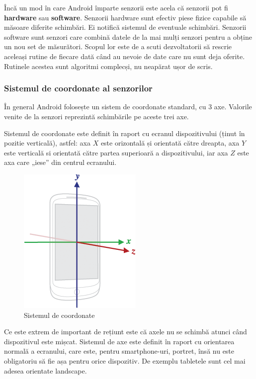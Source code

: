 \documentclass[12pt,a4paper]{article}
\begin{document}
	Încă un mod în care Android împarte senzorii este acela că senzorii pot fi \textbf{hardware} sau \textbf{software}. Senzorii hardware sunt efectiv piese fizice capabile să măsoare diferite schimbări. Ei notifică sistemul de eventuale schimbări. Senzorii software sunt senzori care combină datele de la mai mulți senzori pentru a obține un nou set de măsurători. Scopul lor este de a scuti dezvoltatorii să rescrie aceleași rutine de fiecare dată când au nevoie de date care nu sunt deja oferite. Rutinele acestea sunt algoritmi complecși, nu neapărat ușor de scris.\\
	
\subsubsection{Sistemul de coordonate al senzorilor}
În general Android folosește un sistem de coordonate standard, cu 3 axe. Valorile venite de la senzori reprezintă schimbările pe aceste trei axe.

Sistemul de coordonate este definit în raport cu ecranul dispozitivului (ținut în pozitie verticală), astfel: axa $X$ este orizontală și orientată către dreapta, axa $Y$ este verticală si orientată către partea superioară a dispozitivului, iar axa $Z$ este axa care „iese” din centrul ecranului.

\begin{figure}[hbtp]
\centering
\includegraphics[scale=0.8]{figures/axis_device.png}
\caption{Sistemul de coordonate}
\end{figure}

Ce este extrem de important de rețiunt este că axele nu se schimbă atunci când dispozitivul este mișcat. Sistemul de axe este definit în raport cu orientarea normală a ecranului, care este, pentru smartphone-uri, portret, însă nu este obligatoriu să fie așa pentru orice dispozitiv. De exemplu tabletele sunt cel mai adesea orientate landscape.\\
\end{document}
